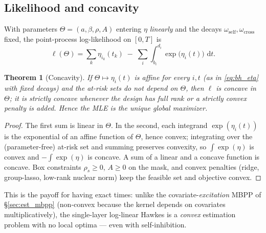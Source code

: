 \documentclass[11pt]{article}
\theoremstyle{plain}
\newtheorem{theorem}[proposition]{Theorem}
\theoremstyle{definition}
\theoremstyle{remark}
\newcommand{\dd}{\,\mathrm{d}}
\begin{document}
\subsection{Likelihood and concavity}
With parameters $\Theta=(a,\beta,\rho,A)$ entering $\eta$ \emph{linearly} and the decays $\omega_{\mathrm{self}},\omega_{\mathrm{cross}}$ fixed, the point-process log-likelihood on $[0,T]$ is
\begin{equation}
\ell(\Theta)=\sum_{k}\eta_{i_k}(t_k)\;-\;\sum_{i}\int_{b_i}^{d_i}\exp\!\big(\eta_i(t)\big)\,\dd t .
\label{eq:bh_ll}
\end{equation}
\begin{theorem}[Concavity]
\label{thm:bh_concave}
If $\Theta\mapsto\eta_i(t)$ is affine for every $i,t$ (as in \eqref{eq:bh_eta} with fixed decays) and the at-risk sets do not depend on $\Theta$, then $\ell$ is concave in $\Theta$; it is strictly concave whenever the design has full rank or a strictly convex penalty is added. Hence the MLE is the unique global maximizer.
\end{theorem}
\begin{proof}
The first sum is linear in $\Theta$. In the second, each integrand $\exp(\eta_i(t))$ is the exponential of an affine function of $\Theta$, hence convex; integrating over the (parameter-free) at-risk set and summing preserves convexity, so $\int\!\exp(\eta)$ is convex and $-\!\int\!\exp(\eta)$ is concave. A sum of a linear and a concave function is concave. Box constraints $\rho_s\ge0$, $A\ge0$ on the mask, and convex penalties (ridge, group-lasso, low-rank nuclear norm) keep the feasible set and objective convex.
\end{proof}
This is the payoff for having exact times: unlike the covariate-\emph{excitation} MBPP of \S\ref{sec:est_mbpp} (non-convex because the kernel depends on covariates multiplicatively), the single-layer log-linear Hawkes is a \emph{convex} estimation problem with no local optima --- even with self-inhibition.
\end{document}

